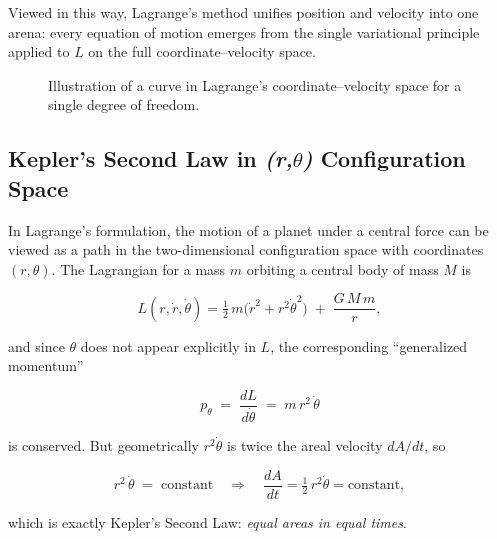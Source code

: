 \medskip

Viewed in this way, Lagrange’s method unifies position and velocity into one arena: every equation of motion emerges from the single variational principle applied to \(L\) on the full coordinate–velocity space.  


\begin{figure}[H]
    \centering
    \caption{Illustration of a curve in Lagrange’s coordinate–velocity space for a single degree of freedom.}
\end{figure}




\subsection{Kepler’s Second Law in \emph{(r,\(\theta\))} Configuration Space}

In Lagrange’s formulation, the motion of a planet under a central force can be viewed as a path in the two-dimensional configuration space with coordinates \((r,\theta)\).  The Lagrangian for a mass \(m\) orbiting a central body of mass \(M\) is

\[
L(r,\dot r,\dot\theta)
=\tfrac12\,m\bigl(\dot r^2 + r^2\dot\theta^2\bigr)
\;+\;\frac{G\,M\,m}{r},
\]

and since \(\theta\) does not appear explicitly in \(L\), the corresponding “generalized momentum”

\[
p_\theta \;=\; \frac{dL}{d\dot\theta} \;=\; m\,r^2\,\dot\theta
\]

is conserved.  But geometrically \(r^2\dot\theta\) is twice the areal velocity \(dA/dt\), so

\[
r^2\,\dot\theta \;=\;\text{constant}
\quad\Longrightarrow\quad
\frac{dA}{dt}=\tfrac12\,r^2\dot\theta=\text{constant},
\]

which is exactly Kepler’s Second Law: \emph{equal areas in equal times}.  


